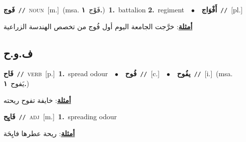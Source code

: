 \documentclass[10pt,a4paper,twoside]{article} %
\begin{document}
\begin{multicols}{2}
{\setlength\topsep{0pt}\textbf{\foreignlanguage{arabic}{فَوج}}\ {\color{gray}\texttt{//}\color{black}}\ \textsc{noun}\ [m.]\ \color{gray}(msa. \foreignlanguage{arabic}{فَوْج}~\foreignlanguage{arabic}{\textbf{١.}})\color{black}\ \textbf{1.}~battalion  \textbf{2.}~regiment\ \ $\bullet$\ \ \setlength\topsep{0pt}\textbf{\foreignlanguage{arabic}{أَفْوَاج}}\ {\color{gray}\texttt{//}\color{black}}\ [pl.]\  \begin{flushright}\color{gray}\foreignlanguage{arabic}{\textbf{\underline{\foreignlanguage{arabic}{أمثلة}}}: خرَّجت الجامعة اليوم أول فُوج من تخصص الهندسة الزراعية}\end{flushright}\color{black}} \vspace{2mm}

\vspace{-3mm}
\subsection*{\color{blue}\foreignlanguage{arabic}{ف.و.ح}\color{blue}{}} 

{\setlength\topsep{0pt}\textbf{\foreignlanguage{arabic}{فَاح}}\ {\color{gray}\texttt{//}\color{black}}\ \textsc{verb}\ [p.]\ \textbf{1.}~spread odour\ \ $\bullet$\ \ \setlength\topsep{0pt}\textbf{\foreignlanguage{arabic}{فُوح}}\ {\color{gray}\texttt{//}\color{black}}\ [c.]\ \ $\bullet$\ \ \setlength\topsep{0pt}\textbf{\foreignlanguage{arabic}{يفُوح}}\ {\color{gray}\texttt{//}\color{black}}\ [i.]\ \color{gray}(msa. \foreignlanguage{arabic}{يَفوح}~\foreignlanguage{arabic}{\textbf{١.}})\color{black}\  \begin{flushright}\color{gray}\foreignlanguage{arabic}{\textbf{\underline{\foreignlanguage{arabic}{أمثلة}}}: خايفة تفوح ريحته}\end{flushright}\color{black}} \vspace{2mm}

{\setlength\topsep{0pt}\textbf{\foreignlanguage{arabic}{فَايِح}}\ {\color{gray}\texttt{//}\color{black}}\ \textsc{adj}\ [m.]\ \textbf{1.}~spreading odour\  \begin{flushright}\color{gray}\foreignlanguage{arabic}{\textbf{\underline{\foreignlanguage{arabic}{أمثلة}}}: ريحة عطرها فايِحَة}\end{flushright}\color{black}} \vspace{2mm}


\end{multicols}
\end{document}
